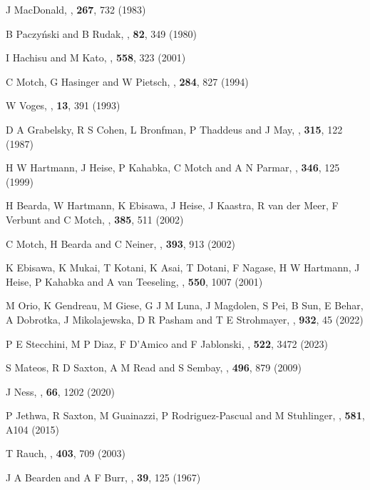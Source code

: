 \begin{thebibliography}{100}
	J MacDonald, \textit{\ApJ}, \textbf{267}, 732 (1983)
	
	B Paczy{\'n}ski and B Rudak, \textit{\AnA}, \textbf{82}, 349 (1980)
	
	I Hachisu and M Kato, \textit{\ApJ}, \textbf{558}, 323 (2001)
	
	C Motch, G Hasinger and W Pietsch, \textit{\AnA}, \textbf{284}, 827 (1994)
	
	W Voges, \textit{\ASR}, \textbf{13}, 391 (1993)	
	
	D A Grabelsky, R S Cohen, L Bronfman, P Thaddeus and  J May, \textit{\ApJ}, \textbf{315}, 122 (1987)

	H W Hartmann, J Heise, P Kahabka, C Motch and A N Parmar, \textit{\AnA}, \textbf{346}, 125 (1999)
	
	H Bearda, W Hartmann, K Ebisawa, J Heise, J Kaastra, R van der Meer, F Verbunt and C Motch, \textit{\AnA}, \textbf{385}, 511 (2002)

	C Motch, H Bearda and C Neiner, \textit{\AnA}, \textbf{393}, 913 (2002)

	K Ebisawa, K Mukai, T Kotani, K Asai, T Dotani, F Nagase, H W Hartmann, J Heise, P Kahabka and A van Teeseling, \textit{\ApJ}, \textbf{550}, 1007 (2001)

	M Orio, K Gendreau, M Giese, G J M Luna, J Magdolen, S Pei, B Sun, E Behar, A Dobrotka, J Mikolajewska, D R Pasham and T E Strohmayer, \textit{\ApJ}, \textbf{932}, 45 (2022)
	
	P E Stecchini, M P Diaz, F D’Amico and F Jablonski, \textit{\MNRAS}, \textbf{522}, 3472 (2023)
	
	S Mateos, R D Saxton, A M Read and S Sembay, \textit{\AnA}, \textbf{496}, 879 (2009)
	
	J Ness, \textit{\ASR}, \textbf{66}, 1202 (2020)
	
	P Jethwa, R Saxton, M Guainazzi, P Rodriguez-Pascual and M Stuhlinger, \textit{\AnA}, \textbf{581}, A104 (2015)
	
	T Rauch, \textit{\AnA}, \textbf{403}, 709 (2003)
	
	J A Bearden and A F Burr, \textit{\RMP}, \textbf{39}, 125 (1967)
	

\end{thebibliography}
